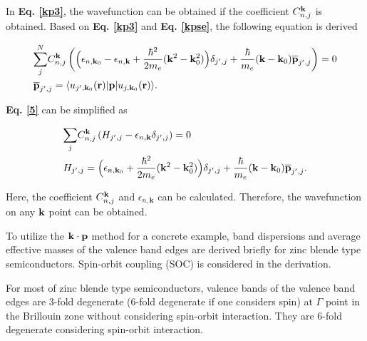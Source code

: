 \documentclass[a4paper, 12pt, titlepage,oneside,drop]{kthesis}
\begin{document}
In \textbf{Eq. \ref{kp3}}, the wavefunction can be obtained if the coefficient $C_{n,j}^{\bold k}$ is obtained. Based on \textbf{Eq. \ref{kp3}} and  \textbf{Eq. \ref{kpse}}, the following equation is derived

\begin{equation}\begin{split}\label{5}
& {\sum\limits_{j}^{N}}  C_{n,j}^{\bold k} \left(  \Big(  \epsilon_{n,\textbf{k}_0} -  \epsilon_{n,\textbf{k}}  + \frac{{\hbar}^2}{2m_e} { (\bold {k}^2- \bold {k}_0^2)}    \Big) \delta_{j',j} + \frac{\hbar}{m_e} {(\bold {k}-\bold{k}_0)} {\overline{\textbf{p}}_{j',j}} \right ) = 0 \\
& {\overline{\textbf{p}}_{j',j}} = \langle \ubloch<j'><\textbf{k}_0>| {\textbf p} | \ubloch<j><\textbf{k}_0>  \rangle.
\end{split}
\end{equation}

\textbf{Eq. \ref{5}} can be simplified as
 
\begin{equation}\begin{split}\label{6}
& {\sum\limits_{j}} C_{n,j}^{\bold {k}} \left ( H_{j',j}-  \epsilon_{n,\textbf{k}} \delta_{j',j} \right ) =0 \\
& H_{j',j} = \Big(   \epsilon_{n,\textbf{k}_0}  + \frac{{\hbar}^2}{2m_e} { (\bold{k}^2-\bold{k}_0^2)}    \Big) \delta_{j',j} + \frac{\hbar}{m_e} {(\bold{k}-\bold{k}_0)} {\overline{\textbf{p}}_{j',j}}.
\end{split}
\end{equation}

Here, the coefficient $ C_{n,j}^{\bold k}$ and $\epsilon_{n,\textbf{k}}$ can be calculated. Therefore, the wavefunction on any ${ \textbf k}$ point can be obtained.


To utilize the $\bold k \cdot \bold p$ method for a concrete example, band dispersions and average effective masses of the valence band edges are derived briefly for zinc blende type semiconductors.
Spin-orbit coupling (SOC) is considered in the derivation.

For most of zinc blende type semiconductors, valence bands of the valence band edges are 3-fold degenerate (6-fold degenerate if one considers spin) at $\Gamma$ point in the Brillouin zone without considering spin-orbit interaction.
They are 6-fold degenerate considering spin-orbit interaction.
\end{document}
